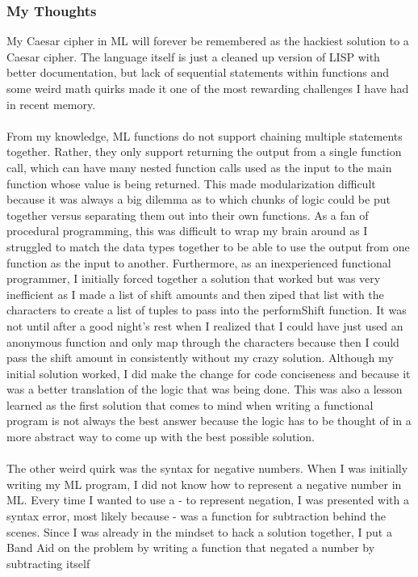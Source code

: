\documentclass[letterpaper, 10pt, DIV=13]{scrartcl}
\numberwithin{equation}{section}
\numberwithin{figure}{section}
\numberwithin{table}{section}
\begin{document}
\subsubsection{My Thoughts}
My Caesar cipher in ML will forever be remembered as the hackiest solution to a Caesar cipher. The language itself is just a cleaned up version of LISP with better
documentation, but lack of sequential statements within functions and some weird math quirks made it one of the most rewarding challenges I have had in recent memory.
\\ \\
From my knowledge, ML functions do not support chaining multiple statements together. Rather, they only support returning the output from a single function call,
which can have many nested function calls used as the input to the main function whose value is being returned. This made modularization difficult because it was
always a big dilemma as to which chunks of logic could be put together versus separating them out into their own functions. As a fan of procedural programming,
this was difficult to wrap my brain around as I struggled to match the data types together to be able to use the output from one function as the input to another.
Furthermore, as an inexperienced functional programmer, I initially forced together a solution that worked but was very inefficient as I made a list of shift amounts
and then ziped that list with the characters to create a list of tuples to pass into the performShift function. It was not until after a good night's rest when I realized
that I could have just used an anonymous function and only map through the characters because then I could pass the shift amount in consistently without my crazy 
solution. Although my initial solution worked, I did make the change for code conciseness and because it was a better translation of the logic that was being done.
This was also a lesson learned as the first solution that comes to mind when writing a functional program is not always the best answer because the logic has to be
thought of in a more abstract way to come up with the best possible solution.
\\ \\
The other weird quirk was the syntax for negative numbers. When I was initially writing my ML program, I did not know how to represent a negative number in ML.
Every time I wanted to use a - to represent negation, I was presented with a syntax error, most likely because - was a function for subtraction behind the scenes.
Since I was already in the mindset to hack a solution together, I put a Band Aid on the problem by writing a function that negated a number by subtracting itself
\end{document}
